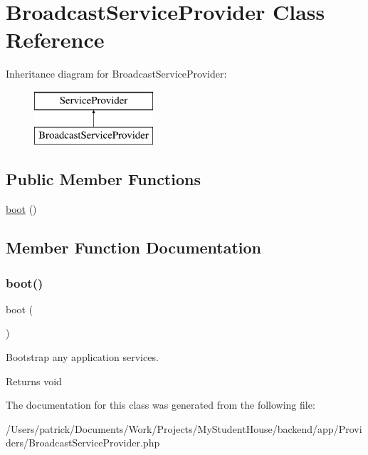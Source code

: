 \hypertarget{class_app_1_1_providers_1_1_broadcast_service_provider}{}\section{Broadcast\+Service\+Provider Class Reference}
\label{class_app_1_1_providers_1_1_broadcast_service_provider}
Inheritance diagram for Broadcast\+Service\+Provider\+:\begin{figure}[H]
\begin{center}
\leavevmode
\includegraphics[height=2.000000cm]{class_app_1_1_providers_1_1_broadcast_service_provider}
\end{center}
\end{figure}
\subsection*{Public Member Functions}
\begin{DoxyCompactItemize}
\item 
\mbox{\hyperlink{class_app_1_1_providers_1_1_broadcast_service_provider_a8814ea4b5beba763c570b4818980814e}{boot}} ()
\end{DoxyCompactItemize}


\subsection{Member Function Documentation}
\mbox{\label{class_app_1_1_providers_1_1_broadcast_service_provider_a8814ea4b5beba763c570b4818980814e}} 
\subsubsection{\texorpdfstring{boot()}{boot()}}
{\footnotesize\ttfamily boot (\begin{DoxyParamCaption}{ }\end{DoxyParamCaption})}

Bootstrap any application services.

\begin{DoxyReturn}{Returns}
void 
\end{DoxyReturn}


The documentation for this class was generated from the following file\+:\begin{DoxyCompactItemize}
\item 
/\+Users/patrick/\+Documents/\+Work/\+Projects/\+My\+Student\+House/backend/app/\+Providers/Broadcast\+Service\+Provider.\+php\end{DoxyCompactItemize}
